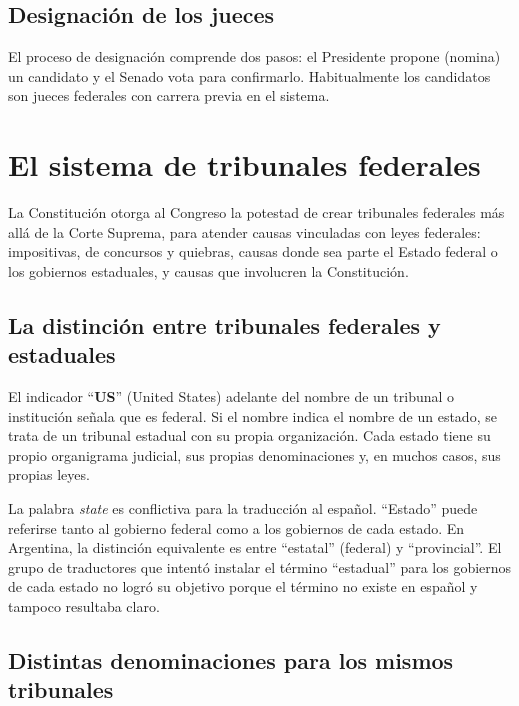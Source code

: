 \documentclass[12pt,oneside]{book}
\begin{document}
\subsection{Designación de los jueces}

El proceso de designación comprende dos pasos: el Presidente propone (nomina) un candidato y el Senado vota para confirmarlo. Habitualmente los candidatos son jueces federales con carrera previa en el sistema.

\section{El sistema de tribunales federales}
\label{sec:tribunales-federales}

La Constitución otorga al Congreso la potestad de crear tribunales federales más allá de la Corte Suprema, para atender causas vinculadas con leyes federales: impositivas, de concursos y quiebras, causas donde sea parte el Estado federal o los gobiernos estaduales, y causas que involucren la Constitución.

\subsection{La distinción entre tribunales federales y estaduales}

El indicador ``\textbf{US}'' (United States) adelante del nombre de un tribunal o institución señala que es federal. Si el nombre indica el nombre de un estado, se trata de un tribunal estadual con su propia organización. Cada estado tiene su propio organigrama judicial, sus propias denominaciones y, en muchos casos, sus propias leyes.

\begin{note}
La palabra \textit{state} es conflictiva para la traducción al español. ``Estado'' puede referirse tanto al gobierno federal como a los gobiernos de cada estado. En Argentina, la distinción equivalente es entre ``estatal'' (federal) y ``provincial''. El grupo de traductores que intentó instalar el término ``estadual'' para los gobiernos de cada estado no logró su objetivo porque el término no existe en español y tampoco resultaba claro.
\end{note}

\subsection{Distintas denominaciones para los mismos tribunales}
\end{document}
